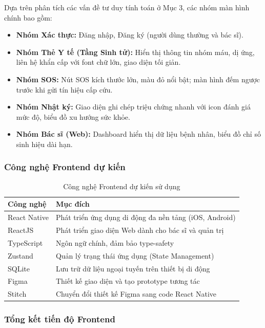 \documentclass[a4paper,12pt]{article}
\begin{document}
Dựa trên phân tích các vấn đề tư duy tính toán ở Mục 3, các nhóm màn hình chính bao gồm:

\begin{itemize}
    \item \textbf{Nhóm Xác thực:} Đăng nhập, Đăng ký (người dùng thường và bác sĩ).
    \item \textbf{Nhóm Thẻ Y tế (Tầng Sinh tử):} Hiển thị thông tin nhóm máu, dị ứng, liên hệ khẩn cấp với font chữ lớn, giao diện tối giản.
    \item \textbf{Nhóm SOS:} Nút SOS kích thước lớn, màu đỏ nổi bật; màn hình đếm ngược trước khi gửi tín hiệu cấp cứu.
    \item \textbf{Nhóm Nhật ký:} Giao diện ghi chép triệu chứng nhanh với icon đánh giá mức độ, biểu đồ xu hướng sức khỏe.
    \item \textbf{Nhóm Bác sĩ (Web):} Dashboard hiển thị dữ liệu bệnh nhân, biểu đồ chỉ số sinh hiệu dài hạn.
\end{itemize}

\subsubsection{Công nghệ Frontend dự kiến}

\begin{table}[H]
    \centering
    \begin{tabularx}{\textwidth}{|l|X|}
    \hline
    \textbf{Công nghệ} & \textbf{Mục đích} \\
    \hline
    React Native & Phát triển ứng dụng di động đa nền tảng (iOS, Android) \\
    \hline
    ReactJS & Phát triển giao diện Web dành cho bác sĩ và quản trị \\
    \hline
    TypeScript & Ngôn ngữ chính, đảm bảo type-safety \\
    \hline
    Zustand & Quản lý trạng thái ứng dụng (State Management) \\
    \hline
    SQLite & Lưu trữ dữ liệu ngoại tuyến trên thiết bị di động \\
    \hline
    Figma & Thiết kế giao diện và tạo prototype tương tác \\
    \hline
    Stitch & Chuyển đổi thiết kế Figma sang code React Native \\
    \hline
    \end{tabularx}
    \caption{Công nghệ Frontend dự kiến sử dụng}
\end{table}

\subsubsection{Tổng kết tiến độ Frontend}
\end{document}
